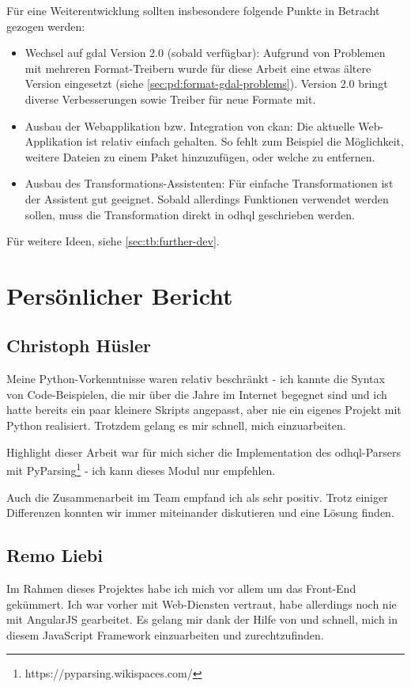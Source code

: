 Für eine Weiterentwicklung sollten insbesondere folgende Punkte in Betracht gezogen werden:

\begin{itemize}
\item Wechsel auf \acs{gdal} Version 2.0 (sobald verfügbar): Aufgrund von Problemen mit mehreren Format-Treibern wurde für diese Arbeit eine etwas ältere Version eingesetzt (siehe \vref{sec:pd:format-gdal-problems}). Version 2.0 bringt diverse Verbesserungen sowie Treiber für neue Formate mit.
\item Ausbau der Webapplikation bzw. Integration von \gls{ckan}: Die aktuelle Web-Applikation ist relativ einfach gehalten. So fehlt zum Beispiel die Möglichkeit, weitere Dateien zu einem Paket hinzuzufügen, oder welche zu entfernen.
\item Ausbau des Transformations-Assistenten: Für einfache Transformationen ist der Assistent gut geeignet. Sobald allerdings Funktionen verwendet werden sollen, muss die Transformation direkt in \acs{odhql} geschrieben werden.
\end{itemize}

Für weitere Ideen, siehe \vref{sec:tb:further-dev}.

\section{Persönlicher Bericht}

\subsection{Christoph Hüsler}
Meine Python-Vorkenntnisse waren relativ beschränkt - ich kannte die Syntax von Code-Beispielen, die mir über die Jahre im Internet begegnet sind und ich hatte bereits ein paar kleinere Skripts angepasst, aber nie ein eigenes Projekt mit Python realisiert. Trotzdem gelang es mir schnell, mich einzuarbeiten.

Highlight dieser Arbeit war für mich sicher die Implementation des \acs{odhql}-Parsers mit PyParsing\footnote{https://pyparsing.wikispaces.com/} - ich kann dieses Modul nur empfehlen. 

Auch die Zusammenarbeit im Team empfand ich als sehr positiv. Trotz einiger Differenzen konnten wir immer miteinander diskutieren und eine Lösung finden. 

\subsection{Remo Liebi}
Im Rahmen dieses Projektes habe ich mich vor allem um das Front-End gekümmert. Ich war vorher mit Web-Diensten vertraut, habe allerdings noch nie mit AngularJS gearbeitet. Es gelang mir dank der Hilfe von \fscf und \chuf schnell, mich in diesem JavaScript Framework einzuarbeiten und zurechtzufinden.


